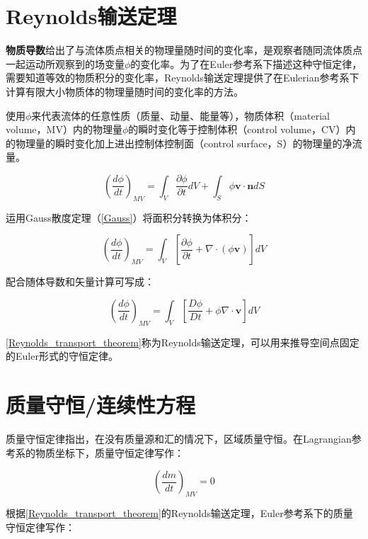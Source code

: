\section{Reynolds输送定理}

\textbf{物质导数}给出了与流体质点相关的物理量随时间的变化率，是观察者随同流体质点一起运动所观察到的场变量$ \phi $的变化率。为了在Euler参考系下描述这种守恒定律，需要知道等效的物质积分的变化率，Reynolds输送定理提供了在Eulerian参考系下计算有限大小物质体的物理量随时间的变化率的方法。

使用$ \phi $来代表流体的任意性质（质量、动量、能量等），物质体积（material volume，MV）内的物理量$ \phi $的瞬时变化等于控制体积（control volume，CV）内的物理量的瞬时变化加上进出控制体控制面（control surface，S）的物理量的净流量。

\begin{equation}
\left( \frac{d\phi}{dt} \right)_{MV} = \int_V \frac{\partial\phi}{\partial t}dV + \int_S \phi\mathbf{v\cdot n} dS
\end{equation}

运用Gauss散度定理（\autoref{Gauss}）将面积分转换为体积分：

\begin{equation}
\left( \frac{d\phi}{dt} \right)_{MV} = \int_V \left[ \frac{\partial\phi}{\partial t} + \nabla\cdot(\phi\mathbf{v}) \right]dV
\end{equation}

配合随体导数和矢量计算可写成：

\begin{equation}\label{Reynolds_transport_theorem}
\left( \frac{d\phi}{dt} \right)_{MV} = \int_V \left[ \frac{D\phi}{Dt} + \phi\nabla\cdot\mathbf{v} \right]dV
\end{equation}

\autoref{Reynolds_transport_theorem}称为Reynolds输送定理，可以用来推导空间点固定的Euler形式的守恒定律。

\section{质量守恒/连续性方程}

质量守恒定律指出，在没有质量源和汇的情况下，区域质量守恒。在Lagrangian参考系的物质坐标下，质量守恒定律写作：

\begin{equation}
\left(\frac{dm}{dt}\right)_{MV} = 0
\end{equation}

根据\autoref{Reynolds_transport_theorem}的Reynolds输送定理，Euler参考系下的质量守恒定律写作：

